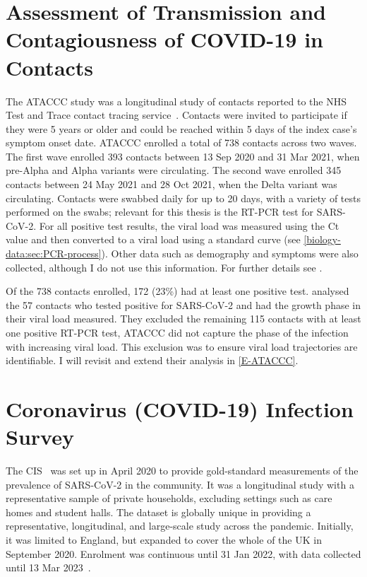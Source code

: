 \documentclass[thesis.tex]{subfiles}
\begin{document}
\section{Assessment of Transmission and Contagiousness of COVID-19 in Contacts} \label{biology-data:sec:ataccc}

The ATACCC study was a longitudinal study of contacts reported to the NHS Test and Trace contact tracing service~\autocite{hakkiOnset}.
Contacts were invited to participate if they were 5 years or older and  could be reached within 5 days of the index case's symptom onset date.
ATACCC enrolled a total of 738 contacts across two waves.
The first wave enrolled 393 contacts between 13 Sep 2020 and 31 Mar 2021, when pre-Alpha and Alpha variants were circulating.
The second wave enrolled 345 contacts between 24 May 2021 and 28 Oct 2021, when the Delta variant was circulating.
Contacts were swabbed daily for up to 20 days, with a variety of tests performed on the swabs; relevant for this thesis is the RT-PCR test for SARS-CoV-2.
For all positive test results, the viral load was measured using the Ct value and then converted to a viral load using a standard curve (see \cref{biology-data:sec:PCR-process}).
Other data such as demography and symptoms were also collected, although I do not use this information.
For further details see \textcite{singanayagamDuration,hakkiOnset}.

Of the 738 contacts enrolled, 172 (23\%) had at least one positive test.
\Textcite{hakkiOnset} analysed the 57 contacts who tested positive for SARS-CoV-2 and had the growth phase in their viral load measured.
They excluded the remaining 115 contacts with at least one positive RT-PCR test, ATACCC did not capture the phase of the infection with increasing viral load.
This exclusion was to ensure viral load trajectories are identifiable.
I will revisit and extend their analysis in \cref{E-ATACCC}.

\section{Coronavirus (COVID-19) Infection Survey} \label{intro:sec:cis}

The CIS~\autocite{CIS} was set up in April 2020 to provide gold-standard measurements of the prevalence of SARS-CoV-2 in the community.
It was a longitudinal study with a representative sample of private households, \ie excluding settings such as care homes and student halls.
The dataset is globally unique in providing a representative, longitudinal, and large-scale study across the pandemic.
Initially, it was limited to England, but expanded to cover the whole of the UK in September 2020.
Enrolment was continuous until 31 Jan 2022, with data collected until 13 Mar 2023~\autocite{weiRisk}. 
\end{document}
